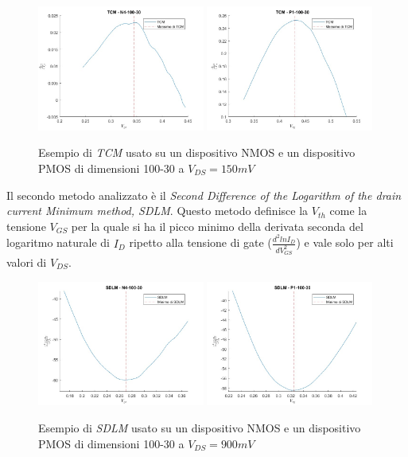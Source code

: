 \documentclass[12pt, letterpaper]{book}
\begin{document}
\begin{figure}[h!]
\centering
 \includegraphics[width=0.49\textwidth]{TCM-N4-100-30-NoFit}
 \includegraphics[width=0.49\textwidth]{TCM-P1-100-30-NoFit}
 \caption{Esempio di \emph{TCM} usato su un dispositivo NMOS e un dispositivo PMOS di dimensioni 100-30 a $V_{DS} = 150 mV$}
\end{figure}

Il secondo metodo analizzato è il \emph{Second Difference of the Logarithm of the drain current Minimum method, SDLM}. Questo metodo definisce la $V_{th}$ come la tensione $V_{GS}$ per la quale si ha il picco minimo della derivata seconda del logaritmo naturale di $I_D$ ripetto alla tensione di gate ($\frac{d^2lnI_D}{dV_{GS}^2}$) e vale solo per alti valori di $V_{DS}$. \\

\begin{figure}[h!]
\centering
 \includegraphics[width=0.49\textwidth]{SDLM-N4-100-30-NoFit}
 \includegraphics[width=0.49\textwidth]{SDLM-P1-100-30-NoFit}
 \caption{Esempio di \emph{SDLM} usato su un dispositivo NMOS e un dispositivo PMOS di dimensioni 100-30 a $V_{DS} = 900 mV$}
\end{figure}
\end{document}

